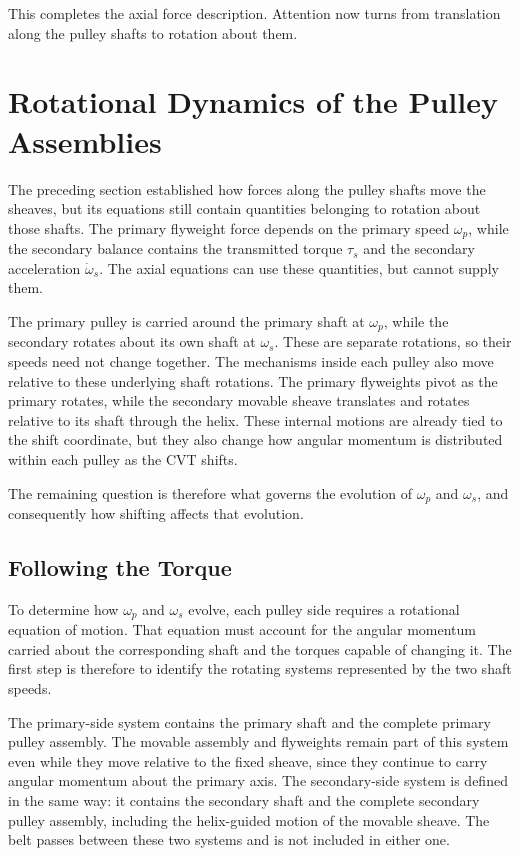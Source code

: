 \documentclass[11pt]{report}
\numberwithin{equation}{section}
\begin{document}
This completes the axial force description. Attention now turns from
translation along the pulley shafts to rotation about them.

\section{Rotational Dynamics of the Pulley Assemblies}
\label{sec:pulley_rotational_dynamics}

The preceding section established how forces along the pulley shafts move the
sheaves, but its equations still contain quantities belonging to rotation about
those shafts. The primary flyweight force depends on the primary speed
\(\omega_p\), while the secondary balance contains the transmitted torque
\(\tau_s\) and the secondary acceleration \(\dot{\omega}_s\). The axial
equations can use these quantities, but cannot supply them.

The primary pulley is carried around the primary shaft at \(\omega_p\), while
the secondary rotates about its own shaft at \(\omega_s\). These are separate
rotations, so their speeds need not change together. The mechanisms inside each 
pulley also move relative to these underlying shaft
rotations. The primary flyweights pivot as the primary rotates, while the
secondary movable sheave translates and rotates relative to its shaft through
the helix. These internal motions are already tied to the shift coordinate,
but they also change how angular momentum is distributed within each pulley as
the CVT shifts.

The remaining question is therefore what governs the evolution of
\(\omega_p\) and \(\omega_s\), and consequently how shifting affects that
evolution.


\subsection{Following the Torque}
\label{sec:pulley_assembly_torque_path}

To determine how \(\omega_p\) and \(\omega_s\) evolve, each pulley side
requires a rotational equation of motion. That equation must account for the
angular momentum carried about the corresponding shaft and the torques capable
of changing it. The first step is therefore to identify the rotating systems
represented by the two shaft speeds.

The primary-side system contains the primary shaft and the complete primary
pulley assembly. The movable assembly and flyweights remain part of this
system even while they move relative to the fixed sheave, since they continue
to carry angular momentum about the primary axis. The secondary-side system is
defined in the same way: it contains the secondary shaft and the complete
secondary pulley assembly, including the helix-guided motion of the movable
sheave. The belt passes between these two systems and is not included in either
one.
\end{document}
